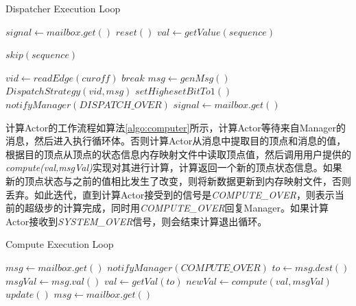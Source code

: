 \begin{algorithm}
{
{

\renewcommand\baselinestretch{1.5}\selectfont %

\caption{Dispatcher Execution Loop}
\label{algo:dispatcher}
\begin{algorithmic}[1]

\STATE
 $signal \leftarrow mailbox.get()$
\STATE $ reset() $
\STATE $val \leftarrow getValue(sequence)$

\STATE $skip(sequence)$
\ENDIF

\STATE $vid \leftarrow readEdge(curoff)$
\STATE $break$
\ENDIF
\STATE $msg \leftarrow genMsg()$
\STATE $DispatchStrategy(vid,msg)$
\ENDWHILE
\STATE $setHighesetBitTo1()$
\ENDIF
\ENDWHILE
\ENDIF
\STATE $notifyManager(DISPATCH\_OVER)$
\STATE $signal \leftarrow mailbox.get()$
\ENDWHILE

\end{algorithmic}
}
\par}
\end{algorithm}


计算Actor的工作流程如算法\ref{algo:computer}所示，计算Actor等待来自Manager的消息，然后进入执行循环体。否则计算Actor从消息中提取目的顶点和消息的值，根据目的顶点从顶点的状态信息内存映射文件中读取顶点值，然后调用用户提供的\textit{compute(val,msgVal)}实现对其进行计算，计算返回一个新的顶点状态信息。如果新的顶点状态与之前的值相比发生了改变，则将新数据更新到内存映射文件，否则丢弃。如此迭代，直到计算Actor接受到的信号是\textit{COMPUTE\_OVER}，则表示当前的超级步的计算完成，同时用\textit{COMPUTE\_OVER}回复Manager。如果计算Actor接收到\textit{SYSTEM\_OVER}信号，则会结束计算退出循环。

\begin{algorithm}
{
{
\renewcommand\baselinestretch{1.5}\selectfont %

\caption{Compute Execution Loop}
\label{algo:computer}
\begin{algorithmic}[1]

\STATE $msg \leftarrow mailbox.get()$
\STATE $notifyManager(COMPUTE\_OVER)$
\ELSE
\STATE $to \leftarrow msg.dest()$
\STATE $msgVal \leftarrow msg.val()$
\STATE $val \leftarrow getVal(to)$
\STATE $newVal \leftarrow compute(val,msgVal)$
	\STATE $update()$
\ENDIF
\ENDIF
\STATE $msg \leftarrow mailbox.get()$
\ENDWHILE


\end{algorithmic}
}
\par}
\end{algorithm}


